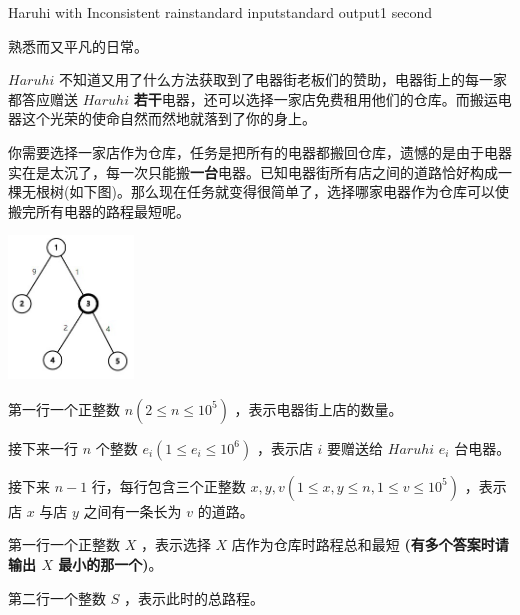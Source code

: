\begin{problem}{Haruhi with Inconsistent rain}{standard input}{standard output}{1 second}

熟悉而又平凡的日常。

$Haruhi$ 不知道又用了什么方法获取到了电器街老板们的赞助，电器街上的每一家都答应赠送 $Haruhi$ \textbf{若干}电器，还可以选择一家店免费租用他们的仓库。而搬运电器这个光荣的使命自然而然地就落到了你的身上。

你需要选择一家店作为仓库，任务是把所有的电器都搬回仓库，遗憾的是由于电器实在是太沉了，每一次只能搬\textbf{一台}电器。已知电器街所有店之间的道路恰好构成一棵无根树(如下图)。那么现在任务就变得很简单了，选择哪家电器作为仓库可以使搬完所有电器的路程最短呢。

\begin{center}
\includegraphics[width=0.25\textwidth]{pics/I.jpg}
\end{center}

\InputFile

第一行一个正整数 $n (2 \leq n \leq 10^5)$ ，表示电器街上店的数量。

接下来一行 $n$ 个整数 $e_i(1 \leq e_i \leq 10^6)$ ，表示店 $i$ 要赠送给 $Haruhi$ $e_i$ 台电器。

接下来 $n-1$ 行，每行包含三个正整数 $x,y,v (1 \leq x,y \leq n,1 \leq v \leq 10^5)$ ，表示店 $x$ 与店 $y$ 之间有一条长为 $v$ 的道路。


\OutputFile

第一行一个正整数 $X$ ，表示选择 $X$ 店作为仓库时路程总和最短 \textbf{(有多个答案时请输出 $X$ 最小的那一个)}。

第二行一个整数 $S$ ，表示此时的总路程。

\Example
\begin{example}
%
\end{example}
\end{problem}
